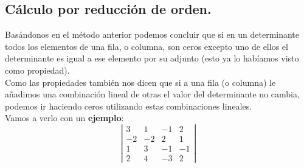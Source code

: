 \documentclass[a4paper,11pt,answers]{exam}
\begin{document}
\subsection{Cálculo por reducción de orden.}
Basándonos en el método anterior podemos concluir que si en un determinante todos los elementos de una fila, o columna, son ceros excepto uno de ellos el determinante es igual a ese elemento por su adjunto (esto ya lo habíamos visto como propiedad).\\

Como las propiedades también nos dicen que si a una fila (o columna) le añadimos una combinación lineal de otras el valor del determinante no cambia, podemos ir haciendo ceros utilizando estas combinaciones lineales.\\

Vamos a verlo con un \textbf{ejemplo}:
\[\left| \begin{array}{rrrr}
	3&1&-1&2\\
	-2&-2&2&1\\
	1&3&-1&-1\\
	2&4&-3&2
\end{array} \right|\]
\end{document}
